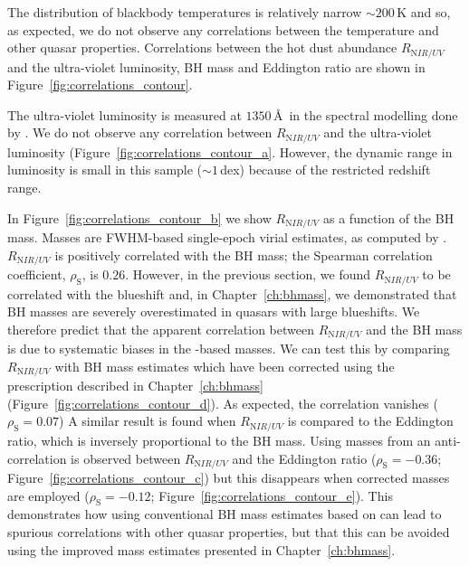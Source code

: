 The distribution of blackbody temperatures is relatively narrow $\sim200$\,K and so, as expected, we do not observe any correlations between the temperature and other quasar properties. 
Correlations between the hot dust abundance $R_{\mathrm NIR/UV}$ and the ultra-violet luminosity, BH mass and Eddington ratio are shown in Figure~\ref{fig:correlations_contour}. 

The ultra-violet luminosity is measured at $1350$\,\AA\, in the spectral modelling done by \citet{shen11}. 
We do not observe any correlation between $R_{\mathrm NIR/UV}$ and the ultra-violet luminosity (Figure~\ref{fig:correlations_contour_a}. 
However, the dynamic range in luminosity is small in this sample ($\sim1$\,dex) because of the restricted redshift range. 

In Figure~\ref{fig:correlations_contour_b} we show $R_{\mathrm NIR/UV}$ as a function of the BH mass. 
Masses are  FWHM-based single-epoch virial estimates, as computed by \citet{shen11}. 
$R_{\mathrm NIR/UV}$ is positively correlated with the BH mass; the Spearman correlation coefficient, $\rho_{\mathrm S}$, is $0.26$. 
However, in the previous section, we found $R_{\mathrm NIR/UV}$ to be correlated with the  blueshift and, in Chapter~\ref{ch:bhmass}, we demonstrated that BH masses are severely overestimated in quasars with large  blueshifts.
We therefore predict that the apparent correlation between $R_{\mathrm NIR/UV}$ and the BH mass is due to systematic biases in the -based masses. 
We can test this by comparing $R_{\mathrm NIR/UV}$ with BH mass estimates which have been corrected using the prescription described in Chapter~\ref{ch:bhmass} (Figure~\ref{fig:correlations_contour_d}). 
As expected, the correlation vanishes ($\rho_{\mathrm S}=0.07$)
A similar result is found when $R_{\mathrm NIR/UV}$ is compared to the Eddington ratio, which is inversely proportional to the BH mass.  
Using masses from \citet{shen11} an anti-correlation is observed between $R_{\mathrm NIR/UV}$ and the Eddington ratio ($\rho_{\mathrm S}=-0.36$; Figure~\ref{fig:correlations_contour_c}) but this disappears when corrected masses are employed ($\rho_{\mathrm S}=-0.12$; Figure~\ref{fig:correlations_contour_e}). 
This demonstrates how using conventional BH mass estimates based on  can lead to spurious correlations with other quasar properties, but that this can be avoided using the improved mass estimates presented in Chapter~\ref{ch:bhmass}. 

